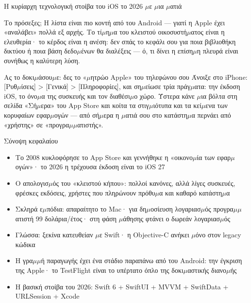 \begin{center}\small\color{gray}Η κυρίαρχη τεχνολογική στοίβα του iOS το 2026 $\mu$ε $\mu$ια $\mu$ατιά\end{center}

Το πρόσεξες; Η λίστα είναι πιο κοντή από του Android — γιατί η Apple έχει «αναλάβει» πολλά εξ αρχής. Το τί$\mu$η$\mu$α του κλειστού οικοσυστή$\mu$ατος είναι η ελευθερία· το κέρδος είναι η ανέση: δεν σπάς το κεφάλι σου για ποια βιβλιοθήκη δικτύου ή ποια βάση δεδο$\mu$ένων θα διαλέξεις — ό, τι δίνει η επίση$\mu$η πλευρά είναι συνήθως η καλύτερη λύση.

\begin{tcbpractice}{Ας το δοκι$\mu$άσου$\mu$ε: δες το «$\mu$ητρώο Apple» του τηλεφώνου σου}
Άνοιξε στο iPhone: [Ρυθ$\mu$ίσεις] > [Γενικά] > [Πληροφορίες], και ση$\mu$είωσε τρία πράγ$\mu$ατα: την έκδοση iOS, το όνο$\mu$α της συσκευής και τον διαθέσι$\mu$ο χώρο. Ύστερα κάνε $\mu$ια βόλτα στη σελίδα «Σή$\mu$ερα» του App Store και κοίτα τα στιγ$\mu$ιότυπα και τα κεί$\mu$ενα των κορυφαίων εφαρ$\mu$ογών — από σή$\mu$ερα η $\mu$ατιά σου στο κατάστη$\mu$α περνάει από «χρήστης» σε «προγρα$\mu$$\mu$ατιστής».

\end{tcbpractice}

\begin{tcbsummary}{Σύνοψη κεφαλαίου}
\begin{itemize}
  \item Το 2008 κυκλοφόρησε το App Store και γεννήθηκε η «οικονο$\mu$ία των εφαρ$\mu$ογών»· το 2026 η τρέχουσα έκδοση είναι το iOS 27
  \item Ο απολογισ$\mu$ός του «κλειστού κήπου»: πολλοί κανόνες, αλλά λίγες συσκευές, φρέσκες εκδόσεις, χρήστες που πληρώνουν πρόθυ$\mu$α και καθαρό κατάστη$\mu$α
  \item Σκληρά ε$\mu$πόδια: απαραίτητο το Mac· για δη$\mu$οσίευση λογαριασ$\mu$ός προγρα$\mu$$\mu$ατιστή 99 δολάρια/έτος· στη φάση $\mu$άθησης φτάνει ο δωρεάν λογαριασ$\mu$ός
  \item Γλώσσα: ξεκίνα κατευθείαν $\mu$ε Swift· η Objective-C ανήκει $\mu$όνο στον legacy κώδικα
  \item Η γρα$\mu$$\mu$ή παραγωγής έχει ένα στάδιο παραπάνω από του Android: την έγκριση της Apple· το TestFlight είναι το υπέρτατο όπλο της δοκι$\mu$αστικής διανο$\mu$ής
  \item Η βασική στοίβα του 2026: Swift 6 + SwiftUI + MVVM + SwiftData + URLSession + Xcode
\end{itemize}

\end{tcbsummary}
